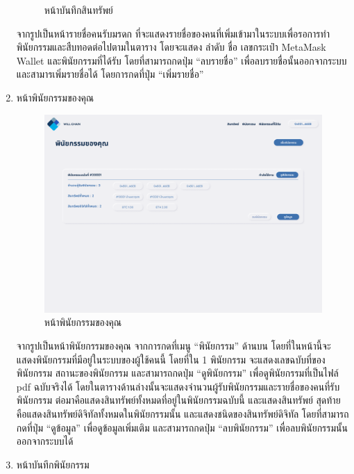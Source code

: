 \documentclass[12pt,oneside,openright,a4paper]{cpe-thai-project}
\begin{document}
\begin{enumerate}[label=\thesubsection.\arabic*,leftmargin=0pt,itemindent=2.5cm]
\begin{figure}[!thb]
			\caption{หน้าบันทึกสินทรัพย์}
		\end{figure}
		\FloatBarrier
		\tab จากรูปเป็นหน้ารายชื่อคนรับมรดก ที่จะแสดงรายชื่อของคนที่เพิ่มเข้ามาในระบบเพื่อรอการทำพินัยกรรมและสืบทอดต่อไปตามในตาราง โดยจะแสดง ลำดับ ชื่อ เลขกระเป๋า MetaMask Wallet และพินัยกรรมที่ได้รับ โดยที่สามารถกดปุ่ม “ลบรายชื่อ” เพื่อลบรายชื่อนั้นออกจากระบบ และสามารเพิ่มรายชื่อได้ โดยการกดที่ปุ่ม “เพิ่มรายชื่อ”
		\item หน้าพินัยกรรมของคุณ
		\begin{figure}[!thb]
			\centering
			\includegraphics[scale=0.25]{userWill}
			\caption{หน้าพินัยกรรมของคุณ}
		\end{figure}
		\FloatBarrier
		\tab จากรูปเป็นหน้าพินัยกรรมของคุณ จากการกดที่เมนู “พินัยกรรม” ด้านบน โดยที่ในหน้านี้จะแสดงพินัยกรรมที่มีอยู่ในระบบของผู้ใช้คนนี้ โดยที่ใน 1 พินัยกรรม จะแสดงเลขฉบับที่ของพินัยกรรม สถานะของพินัยกรรม และสามารถกดปุ่ม “ดูพินัยกรรม” เพื่อดูพินัยกรรมที่เป็นไฟล์ pdf ฉบับจริงได้ โดยในตารางด้านล่างนั้นจะแสดงจำนวนผู้รับพินัยกรรมและรายชื่อของคนที่รับพินัยกรรม ต่อมาคือแสดงสินทรัพย์ทั้งหมดที่อยู่ในพินัยกรรมฉบับนี้ และแสดงสินทรัพย์ สุดท้ายคือแสดงสินทรัพย์ดิจิทัลทั้งหมดในพินัยกรรมนั้น และแสดงชนิดของสินทรัพย์ดิจิทัล โดยที่สามารถกดที่ปุ่ม “ดูข้อมูล” เพื่อดูข้อมูลเพิ่มเติม และสามารถกดปุ่ม “ลบพินัยกรรม” เพื่อลบพินัยกรรมนั้นออกจากระบบได้
		\item หน้าบันทึกพินัยกรรม
		\begin{figure}[!thb]
			\centering

\end{figure}
\end{enumerate}
\end{document}
